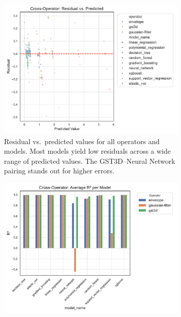 \begin{figure}[htbp]
    \centering
    \begin{subfigure}[t]{0.49\textwidth}
        \centering
        \includegraphics[width=\textwidth]{assets/images/05/residual_vs_predicted}
        \caption{Residual vs.\ predicted values for all operators and models.
            Most models yield low residuals across a wide range of predicted values.
            The \ac{GST3D}–Neural Network pairing stands out for higher errors.
        }
    \end{subfigure}
    \hfill
    \begin{subfigure}[t]{0.49\textwidth}
        \centering
        \includegraphics[width=\textwidth]{assets/images/05/cross_model_r2_bar}

\end{subfigure}
\end{figure}
